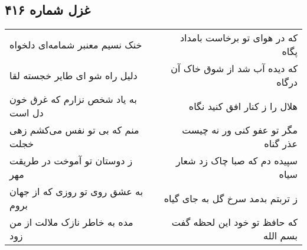 \begin{center}
\section*{غزل شماره ۴۱۶}
\label{sec:sh416}
\begin{longtable}{l p{0.5cm} r}
خنک نسیم معنبر شمامه‌ای دلخواه
&&
که در هوای تو برخاست بامداد پگاه
\\
دلیل راه شو ای طایر خجسته لقا
&&
که دیده آب شد از شوق خاک آن درگاه
\\
به یاد شخص نزارم که غرق خون دل است
&&
هلال را ز کنار افق کنید نگاه
\\
منم که بی تو نفس می‌کشم زهی خجلت
&&
مگر تو عفو کنی ور نه چیست عذر گناه
\\
ز دوستان تو آموخت در طریقت مهر
&&
سپیده دم که صبا چاک زد شعار سیاه
\\
به عشق روی تو روزی که از جهان بروم
&&
ز تربتم بدمد سرخ گل به جای گیاه
\\
مده به خاطر نازک ملالت از من زود
&&
که حافظ تو خود این لحظه گفت بسم الله
\\
\end{longtable}
\end{center}
